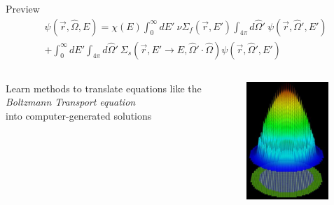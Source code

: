 \documentclass[xcolor=x11names,compress]{beamer}
\renewcommand{\(}{\begin{columns}}
\renewcommand{\)}{\end{columns}}
\newcommand{\<}[1]{\begin{column}{#1}}
\renewcommand{\>}{\end{column}}
\newcommand{\Macro}{\ensuremath{\Sigma}}
\newcommand{\vOmega}{\ensuremath{\hat{\Omega}}}
\begin{document}

\begin{frame}{Preview}
\begin{align}
  [\vOmega \cdot \nabla + \Macro(\vec{r}, E)] &\psi(\vec{r}, \vOmega, E)  = \chi(E) \int_0^{\infty} dE' \:\nu \Macro_{f}(\vec{r}, E') \int_{4\pi} d\vOmega' \:\psi(\vec{r}, \vOmega', E')  \nonumber \\
   &+ \int_0^{\infty} dE' \int_{4\pi} d\vOmega' \:\Macro_{s}(\vec{r}, E' \to E, \vOmega' \cdot \vOmega) \psi(\vec{r}, \vOmega', E')  \nonumber
\end{align}
\vspace{-2em}
\begin{columns}
  \begin{column}{0.5\textwidth}
    Learn methods to translate equations like the \\\emph{Boltzmann Transport equation} \\into computer-generated solutions
  \end{column}
  \begin{column}{0.5\textwidth}
    \begin{figure}
    \includegraphics[height=1.75in,clip]{UNIC_powerDist}
    \end{figure}
  \end{column}
\end{columns}
\end{frame}
\end{document}
